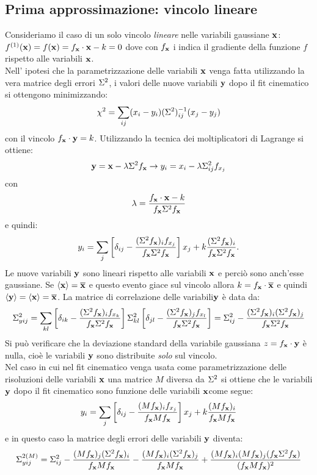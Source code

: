 \subsection{Prima approssimazione: vincolo lineare}
%
Consideriamo il caso di un solo vincolo {\em lineare} nelle variabili gaussiane ${\bf x}$: $f^{(1)}({\bf x})=f({\bf x})=f_{\bf x}\cdot{\bf x}-k=0$
dove con $f_{\bf x}$ i indica il gradiente della funzione $f$ rispetto alle
variabili ${\bf x}$.\\Nell' ipotesi che la parametrizzazione delle variabili ${\bf x}$ venga fatta
utilizzando la vera matrice degli errori $\Sigma^2$, i valori delle nuove
variabili ${\bf y}$ dopo il fit cinematico si ottengono minimizzando:\[\chi^2=\sum_{ij}(x_i-y_i)(\Sigma^2)^{-1}_{ij}(x_j-y_j)\]con il vincolo $f_{\bf x}\cdot{\bf y}=k$. Utilizzando la tecnica dei moltiplicatori
di Lagrange si ottiene:
\[{\bf y}={\bf x}-\lambda\Sigma^2 f_{\bf x}\rightarrow y_i=x_i-\lambda\Sigma^2_{ij}f_{x_j}\]
con
\[\lambda=\frac{f_{\bf x}\cdot{\bf x}-k}{f_{\bf x}\Sigma^2 f_{\bf x}}\]
e quindi:
\begin{equation}
\label{plane_proj}
y_i=\sum_j\left[\delta_{ij}-\frac{(\Sigma^2 f_{\bf x})_i f_{x_j}}{f_{\bf x}\Sigma^2 f_{\bf x}}\right]x_j+k\frac{(\Sigma^2 f_{\bf x})_i}{f_{\bf x}\Sigma^2 f_{\bf x}}.
\end{equation}
Le nuove variabili ${\bf y}$ sono lineari rispetto alle variabili ${\bf x}$ e perci\`o
sono anch'esse gaussiane. Se $\langle{\bf x}\rangle=\overline{{\bf x}}$ e questo evento giace sul vincolo allora $k=f_{\bf x}\cdot\overline{{\bf x}}$ e quindi $\langle{\bf y}\rangle=\langle{\bf x}\rangle=\overline{{\bf x}}$. La matrice di correlazione delle variabili${\bf y}$ \`e data da:
\[\Sigma^2_{yij}=\sum_{kl}\left[\delta_{ik}-\frac{(\Sigma^2 f_{\bf x})_i f_{x_k}}{f_{\bf x}\Sigma^2 f_{\bf x}}\right]\Sigma^2_{kl}\left[\delta_{jl}-\frac{(\Sigma^2 f_{\bf x})_j f_{x_l}}{f_{\bf x}\Sigma^2 f_{\bf x}}\right]=\Sigma^2_{ij}-\frac{(\Sigma^2 f_{\bf x})_i(\Sigma^2 f_{\bf x})_j}{f_{\bf x}\Sigma^2 f_{\bf x}}\]
Si pu\`o verificare che la deviazione standard della variabile gaussiana $z=f_{\bf x}\cdot{\bf y}$ \`e nulla, cio\`e le variabili ${\bf y}$ sono distribuite {\em solo} sul vincolo.\\Nel caso in cui nel fit cinematico venga usata come parametrizzazione delle risoluzioni delle variabili ${\bf x}$ una matrice $M$ diversa da $\Sigma^2$ si ottiene
che le variabili ${\bf y}$ dopo il fit cinematico sono funzione delle variabili ${\bf x}$come segue:
\[y_i=\sum_j\left[\delta_{ij}-\frac{(Mf_{\bf x})_i f_{x_j}}{f_{\bf x} M f_{\bf x}}\right]x_j+k\frac{(M f_{\bf x})_i}{f_{\bf x} M f_{\bf x}}\]
e in questo caso la matrice degli errori delle variabili ${\bf y}$ diventa:\[\Sigma^{2(M)}_{yij}=\Sigma^2_{ij}-\frac{(M f_{\bf x})_j(\Sigma^2 f_{\bf x})_i}{f_{\bf x} M f_{\bf x}}-\frac{(M f_{\bf x})_i(\Sigma^2 f_{\bf x})_j}{f_{\bf x} M f_{\bf x}}+\frac{(M f_{\bf x})_i(M f_{\bf x})_j(f_{\bf x}\Sigma^2 f_{\bf x})}{(f_{\bf x} M f_{\bf x})^2}\]
